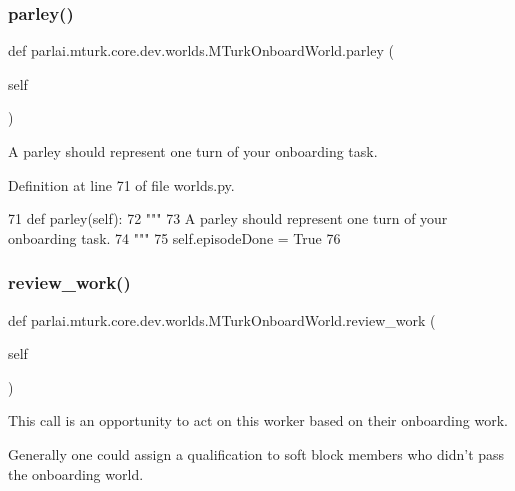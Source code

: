 \subsubsection{\texorpdfstring{parley()}{parley()}}
{\footnotesize\ttfamily def parlai.\+mturk.\+core.\+dev.\+worlds.\+M\+Turk\+Onboard\+World.\+parley (\begin{DoxyParamCaption}\item[{}]{self }\end{DoxyParamCaption})}

\begin{DoxyVerb}A parley should represent one turn of your onboarding task.
\end{DoxyVerb}
 

Definition at line 71 of file worlds.\+py.


\begin{DoxyCode}
71     \textcolor{keyword}{def }parley(self):
72         \textcolor{stringliteral}{"""}
73 \textcolor{stringliteral}{        A parley should represent one turn of your onboarding task.}
74 \textcolor{stringliteral}{        """}
75         self.episodeDone = \textcolor{keyword}{True}
76 
\end{DoxyCode}
\mbox{\label{classparlai_1_1mturk_1_1core_1_1dev_1_1worlds_1_1MTurkOnboardWorld_acb185e5b30b8d04aa633adf4a25fdfa7}} 
\subsubsection{\texorpdfstring{review\+\_\+work()}{review\_work()}}
{\footnotesize\ttfamily def parlai.\+mturk.\+core.\+dev.\+worlds.\+M\+Turk\+Onboard\+World.\+review\+\_\+work (\begin{DoxyParamCaption}\item[{}]{self }\end{DoxyParamCaption})}

\begin{DoxyVerb}This call is an opportunity to act on this worker based on their onboarding
work.

Generally one could assign a qualification to soft block members who didn't pass
the onboarding world.
\end{DoxyVerb}
 

